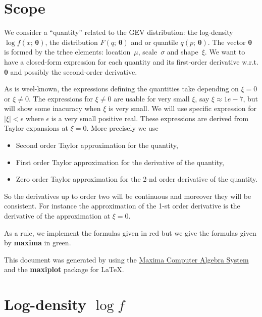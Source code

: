 

\section{Scope}

We consider a ``quantity'' related to the GEV distribution: the
log-density $\log f(x;\,\boldsymbol{\theta})$, the distribution
$F(q;\,\boldsymbol{\theta})$ and or quantile
$q(p;\,\boldsymbol{\theta})$. The vector $\boldsymbol{\theta}$ is
formed by the trhee elements: location~$\mu$, scale~$\sigma$ and
shape~$\xi$. We want to have a closed-form expression for each
quantity and its first-order derivative w.r.t. $\boldsymbol{\theta}$
and possibly the second-order derivative.

As is weel-known, the expressions defining the quantities take
depending on $\xi = 0$ or $\xi \neq 0$. The expressions for
$\xi \neq 0$ are usable for very small $\xi$, say $\xi \approx 1e-7$,
but will show some inacuracy when $\xi$ is very small. We will use
specific expression for $|\xi| < \epsilon$ where $\epsilon$ is a very small
positive real. These expressions are derived from Taylor expansions
at $\xi = 0$. More precisely we use

\begin{itemize}
\item Second order Taylor approximation for the quantity,
\item First  order Taylor approximation for the derivative of the quantity,
\item Zero order Taylor approximation for the 2-nd order
  derivative of the quantity.
\end{itemize}
So the derivatives up to order two will be continuous and moreover
they will be consistent. For instance the approximation of the 1-st
order derivative is the derivative of the approximation at $\xi = 0$.

As a rule, we implement the formulas given {\color{red}in red} but we
give the formulas given by \textbf{maxima} {\color{MonVertF} in
  green}. 

This document was generated by using the
\href{https://maxima.sourceforge.io/Maxima}{Maxima Computer Algebra System}
and the \textbf{maxiplot} package for \LaTeX{}.


\section{Log-density $\log f$}

